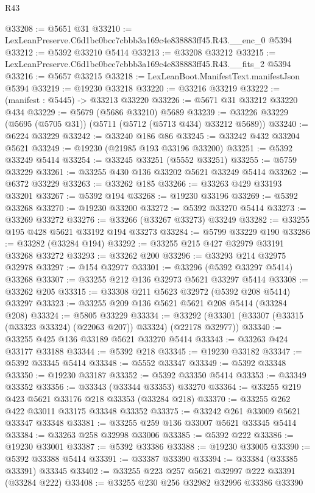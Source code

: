 \begin{lexlean}{R43}
\begin{coremodule}
@33208 := @5651 @31
@33210 := LexLeanPreserve.C6d1bc0bcc7cbbb3a169c4e838883ff45.R43.__enc_0 @5394
@33212 := @5392 @33210 @5414
@33213 := @33208 @33212
@33215 := LexLeanPreserve.C6d1bc0bcc7cbbb3a169c4e838883ff45.R43.__fits_2 @5394
@33216 := @5657 @33215
@33218 := LexLeanBoot.ManifestText.manifestJson @5394
@33219 := @19230 @33218
@33220 := @33216 @33219
@33222 := (manifest : @5445) -> @33213 @33220
@33226 := @5671 @31 @33212 @33220 @434
@33229 := @5679 (@5686 @33210) @5689
@33239 := @33226 @33229 (@5695 (@5705 @31)) (@5711 (@5712 (@5713 @434) @33212 @5689))
@33240 := @6224 @33229
@33242 := @33240 @186 @86
@33245 := @33242 @432 @33204 @5621
@33249 := @19230 (@21985 @193 @33196 @33200)
@33251 := @5392 @33249 @5414
@33254 := @33245 @33251 (@5552 @33251)
@33255 := @5759 @33229
@33261 := @33255 @430 @136 @33202 @5621 @33249 @5414
@33262 := @6372 @33229
@33263 := @33262 @185
@33266 := @33263 @429 @33193 @33201
@33267 := @5392 @194
@33268 := @19230 @33196
@33269 := @5392 @33268
@33270 := @19230 @33200
@33272 := @5392 @33270 @5414
@33273 := @33269 @33272
@33276 := @33266 (@33267 @33273) @33249
@33282 := @33255 @195 @428 @5621 @33192 @194 @33273
@33284 := @5799 @33229 @190
@33286 := @33282 (@33284 @194)
@33292 := @33255 @215 @427 @32979 @33191 @33268 @33272
@33293 := @33262 @200
@33296 := @33293 @214 @32975 @32978
@33297 := @154 @32977
@33301 := @33296 (@5392 @33297 @5414) @33268
@33307 := @33255 @212 @136 @32973 @5621 @33297 @5414
@33308 := @33262 @205
@33315 := @33308 @211 @5623 @32972 (@5392 @208 @5414) @33297
@33323 := @33255 @209 @136 @5621 @5621 @208 @5414 (@33284 @208)
@33324 := @5805 @33229
@33334 := @33292 (@33301 (@33307 (@33315 (@33323 @33324) (@22063 @207)) @33324) (@22178 @32977))
@33340 := @33255 @425 @136 @33189 @5621 @33270 @5414
@33343 := @33263 @424 @33177 @33188
@33344 := @5392 @218
@33345 := @19230 @33182
@33347 := @5392 @33345 @5414
@33348 := @5552 @33347
@33349 := @5392 @33348
@33350 := @19230 @33187
@33352 := @5392 @33350 @5414
@33353 := @33349 @33352
@33356 := @33343 (@33344 @33353) @33270
@33364 := @33255 @219 @423 @5621 @33176 @218 @33353 (@33284 @218)
@33370 := @33255 @262 @422 @33011 @33175 @33348 @33352
@33375 := @33242 @261 @33009 @5621 @33347 @33348
@33381 := @33255 @259 @136 @33007 @5621 @33345 @5414
@33384 := @33263 @258 @32998 @33006
@33385 := @5392 @222
@33386 := @19230 @33001
@33387 := @5392 @33386
@33388 := @19230 @33005
@33390 := @5392 @33388 @5414
@33391 := @33387 @33390
@33394 := @33384 (@33385 @33391) @33345
@33402 := @33255 @223 @257 @5621 @32997 @222 @33391 (@33284 @222)
@33408 := @33255 @230 @256 @32982 @32996 @33386 @33390

\end{coremodule}
\end{lexlean}
